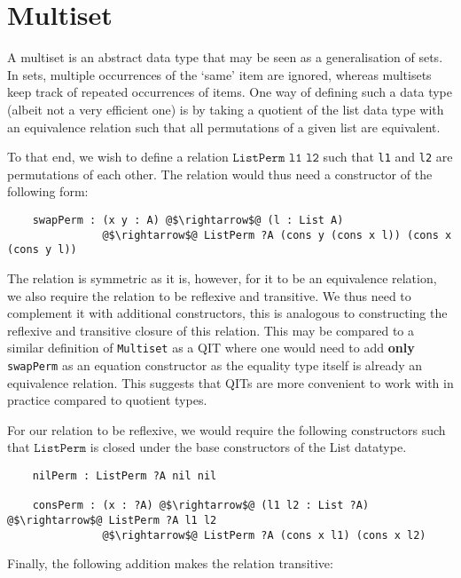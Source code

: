 \documentclass[12pt,twoside,maitrise]{dms}
\theoremstyle{definition}
\numberwithin{equation}{section}
\numberwithin{table}{chapter}
\numberwithin{figure}{chapter}
\newcommand\id[1] {\texttt{#1}}
\newcommand\fn[1] {\texttt{#1}}
\begin{document}
\section{Multiset}\label{sec:multiset}

A multiset is an abstract data type that may be seen as a generalisation of
sets. In sets, multiple occurrences of the `same' item are ignored, whereas
multisets keep track of repeated occurrences of items. One way of defining such
a data type (albeit not a very efficient one) is by taking a quotient of the
list data type with an equivalence relation such that all permutations of a
given list are equivalent.

To that end, we wish to define a relation $\fn{ListPerm l1 l2}$ such that
\id{l1} and \id{l2} are permutations of each other. The relation would thus need
a constructor of the following form:

\begin{verbatim}
    swapPerm : (x y : A) @$\rightarrow$@ (l : List A)
               @$\rightarrow$@ ListPerm ?A (cons y (cons x l)) (cons x (cons y l))
\end{verbatim}

The relation is symmetric as it is, however, for it to be an equivalence
relation, we also require the relation to be reflexive and transitive. We thus
need to complement it with additional constructors, this is analogous to
constructing the reflexive and transitive closure of this relation. This may be
compared to a similar definition of \id{Multiset} as a QIT where one would need
to add \textbf{only} \id{swapPerm} as an equation constructor as the equality
type itself is already an equivalence relation. This suggests that QITs are more
convenient to work with in practice compared to quotient types.

For our relation to be reflexive, we would require the following constructors
such that $\fn{ListPerm}$ is closed under the base constructors of the List
datatype.

\begin{verbatim}
    nilPerm : ListPerm ?A nil nil

    consPerm : (x : ?A) @$\rightarrow$@ (l1 l2 : List ?A) @$\rightarrow$@ ListPerm ?A l1 l2
               @$\rightarrow$@ ListPerm ?A (cons x l1) (cons x l2)
\end{verbatim}

Finally, the following addition makes the relation transitive:
\end{document}
